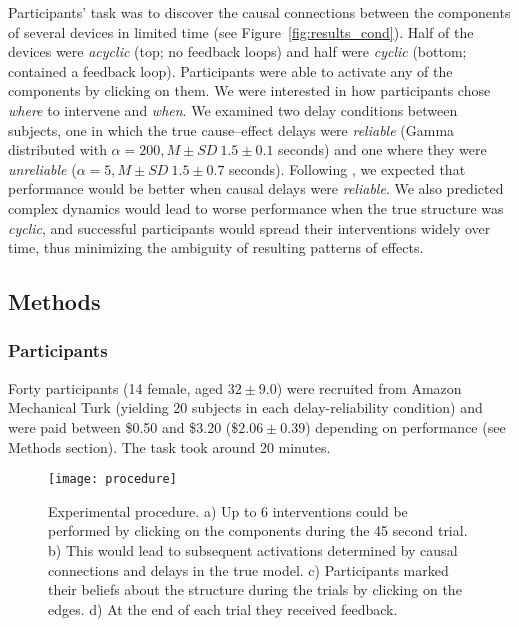 \documentclass[10pt,letterpaper]{article}
\begin{document}
Participants' task was to discover the causal connections between the components of several devices in limited time (see Figure~\ref{fig:results_cond}). Half of the devices were \emph{acyclic} (top; no feedback loops) and half were \emph{cyclic} (bottom; contained a feedback loop).
Participants were able to activate any of the components by clicking on them. 
We were interested in how participants chose \emph{where} to intervene and \emph{when}.  We examined two delay conditions between subjects, one in which the true cause--effect delays were \emph{reliable} (Gamma distributed with $\alpha=200, M\pm SD~1.5\pm0.1$ seconds) and one where they were \emph{unreliable} ($\alpha=5, M\pm SD~1.5\pm0.7$ seconds). 
Following \cite{greville2010temporal}, we expected that performance would be better when causal delays were \emph{reliable}.  We also predicted complex dynamics would lead to worse performance when the true structure was \emph{cyclic}, and successful participants would spread their interventions widely over time, thus minimizing the ambiguity of resulting patterns of effects.

\subsection{Methods}

\subsubsection*{Participants}
 
Forty participants (14 female, aged $32\pm 9.0$) were recruited from Amazon Mechanical Turk (yielding 20 subjects in each delay-reliability condition) and were paid between \$0.50 and \$3.20 (\$$2.06\pm0.39$) depending on performance (see Methods section).  The task took around 20 minutes.

\begin{figure*}[t]
   \centering
   \texttt{[image: procedure]}
   \caption[Experimental procedure]{Experimental procedure. a) Up to 6 interventions could be performed by clicking on the components during the 45 second trial.  b) This would lead to subsequent activations determined by causal connections and delays in the true model.  c) Participants marked their beliefs about the structure during the trials by clicking on the edges.  d) At the end of each trial they received feedback.}
   \label{fig:procedure}
   \vspace{-0.6cm}
\end{figure*}
\end{document}
